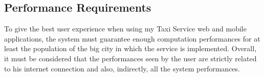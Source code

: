 \subsection{Performance Requirements}
To give the best user experience when using my Taxi Service web and mobile applications, the system must guarantee enough computation performances for at least the population of the big city in which the service is implemented.
Overall, it must be considered that the performances seen by the user are strictly related to his internet connection and also, indirectly, all the system performances.